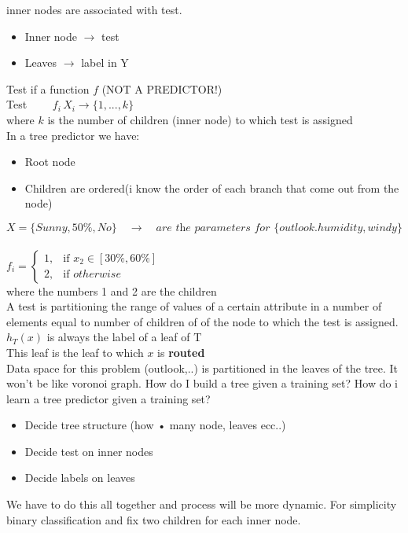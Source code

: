 \documentclass[../main.tex]{subfiles}
\begin{document}
inner nodes are associated with test.
\begin{itemize}
\item Inner node $\rightarrow$ test
\item Leaves $\rightarrow$ label in Y
\end{itemize}
Test if a function $f$ (NOT A PREDICTOR!) \\
Test $ \qquad f_i \, X_i \rightarrow \{1,...,k\}$
\\ where $k$ is the number of children (inner node) to which test is assigned
\\
In a tree predictor we have:
\begin{itemize}
\item Root node
\item Children are ordered(i know the order of each branch that come out from the node)
\end{itemize}
$$
X = \{Sunny, 50\%, No \} \quad \rightarrow \quad \textit{are the parameters for } \{outlook. humidity, windy \} 
$$
\\
$
f_i = 
\begin{cases} 
1, & \mbox{if } x_2 \in [30 \%,60 \% ] 
\\ 
2, & \mbox{if } otherwise \end{cases}
$
\\ where the numbers 1 and 2 are the children
\\
A test is partitioning the range of values of a certain attribute in a number of
elements equal to number of children of of the node to which the test is
assigned.
\\
$h_T(x)$ is always the label of a leaf of T\\
This leaf is the leaf to which $x$ is \textbf{routed}
\\
Data space for this problem (outlook,..) is partitioned in the leaves of the tree.
It won’t be like voronoi graph.
How do I build a tree given a training set?
How do i learn a tree predictor given a training set?
\begin{itemize}
\item Decide tree structure (how • many node, leaves ecc..)
\item Decide test on inner nodes
\item Decide labels on leaves
\end{itemize}
We have to do this all together and process will be more dynamic.
For simplicity binary classification and fix two children for each inner node.\\\\
\end{document}
